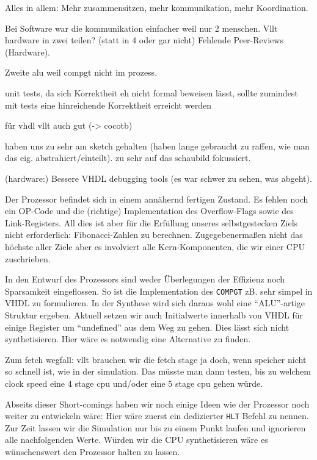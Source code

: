 \documentclass[paper=a4,fontsize=12pt,twocolumn]{scrreprt}
\begin{document}
Alles in allem: Mehr zusammensitzen, mehr kommunikation, mehr Koordination.

Bei Software war die kommunikation einfacher weil nur 2 menschen.
Vllt hardware in zwei teilen? (statt in 4 oder gar nicht)
Fehlende Peer-Reviews (Hardware).


Zweite alu weil compgt nicht im prozess.

unit tests, da sich Korrektheit eh nicht formal beweisen lässt, sollte zumindest mit tests eine hinreichende Korrektheit erreicht werden

für vhdl vllt auch gut (-> cocotb)

haben uns zu sehr am sketch gehalten (haben lange gebraucht zu raffen, wie man das eig. abstrahiert/einteilt). zu sehr auf das schaubild fokussiert.


(hardware:) Bessere VHDL debugging tools (es war schwer zu sehen, was abgeht).

Der Prozessor befindet sich in einem annähernd fertigen Zustand.
Es fehlen noch ein OP-Code und die (richtige) Implementation des Overflow-Flags sowie des Link-Registers.
All dies ist aber für die Erfüllung unseres selbstgestecken Ziels nicht erforderlich: Fibonacci-Zahlen zu berechnen.
Zugegebenermaßen nicht das höchste aller Ziele aber es involviert alle Kern-Komponenten, die wir einer CPU zuschrieben.

In den Entwurf des Prozessors sind weder Überlegungen der Effizienz noch Sparsamkeit eingeflossen.
So ist die Implementation des \texttt{COMPGT} zB. sehr simpel in VHDL zu formulieren.
In der Synthese wird sich daraus wohl eine \enquote{ALU}-artige Struktur ergeben.
Aktuell setzen wir auch Initialwerte innerhalb von VHDL für einige Register um \enquote{undefined} aus dem Weg zu gehen.
Dies lässt sich nicht synthetisieren.
Hier wäre es notwendig eine Alternative zu finden.

Zum fetch wegfall: vllt brauchen wir die fetch stage ja doch, wenn speicher nicht so schnell ist, wie in der simulation. Das müsste man dann testen, bis zu welchem clock speed eine 4 stage cpu und/oder eine 5 stage cpu gehen würde.

Abseits dieser Short-comings haben wir noch einige Ideen wie der Prozessor noch weiter zu entwickeln wäre:
Hier wäre zuerst ein dedizierter \texttt{HLT} Befehl zu nennen.
Zur Zeit lassen wir die Simulation nur bis zu einem Punkt laufen und ignorieren alle nachfolgenden Werte.
Würden wir die CPU synthetisieren wäre es wünschenswert den Prozessor halten zu lassen.
\end{document}
